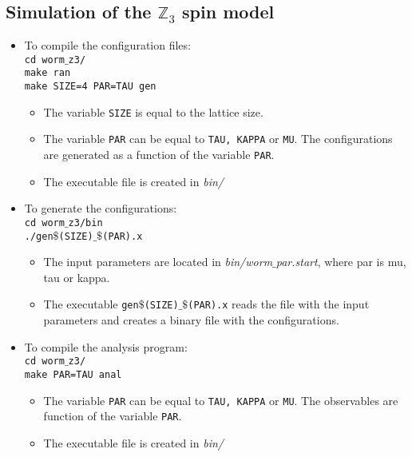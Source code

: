 \documentclass[a4paper,10pt]{report}
\begin{document}
\subsection*{Simulation of the $\mathds{Z}_3$ spin model}
\begin{itemize}[leftmargin=*]
 \item To compile the configuration files:
 \vspace*{2mm}
 \texttt{
 \\cd worm$\_$z3/
 \\make ran   
 \\make SIZE=4 PAR=TAU gen
 }

 \begin{itemize}[leftmargin=*]
  \item The variable {\tt SIZE} is equal to the lattice size.
  \item The variable {\tt PAR} can be equal to {\tt TAU, KAPPA} or {\tt MU}.
  The configurations are generated as a function of the variable {\tt PAR}.
  \item The executable file is created in {\it bin/}
 \end{itemize}
 
 \item To generate the configurations:
 \vspace*{2mm}
 \texttt{
 \\cd worm$\_$z3/bin
 \\./gen$\$$(SIZE)$\_\$$(PAR).x   
 }

 \begin{itemize}[leftmargin=*]
  \item The input parameters are located in {\it bin/worm$\_$par.start}, where par is mu, tau or kappa.
  \item The executable {\tt gen$\$$(SIZE)$\_\$$(PAR).x} reads the file with the input parameters and creates
  a binary file with the configurations.
 \end{itemize}
 
 
 
 \item To compile the analysis program:
 \vspace*{2mm}
 \texttt{
 \\cd worm$\_$z3/   
 \\make PAR=TAU anal
 }

 \begin{itemize}[leftmargin=*]
  \item The variable {\tt PAR} can be equal to {\tt TAU, KAPPA} or {\tt MU}.
  The observables are function of the variable {\tt PAR}.
  \item The executable file is created in {\it bin/}
 \end{itemize}
 

\end{itemize}
\end{document}
